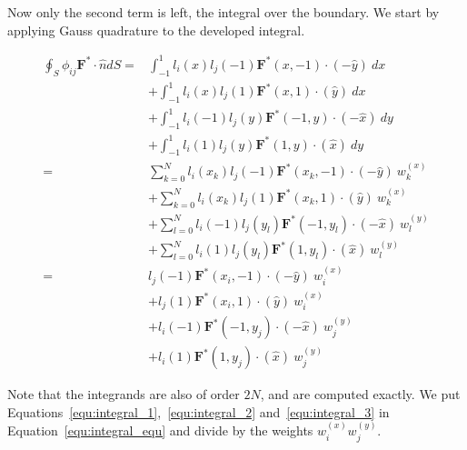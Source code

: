 Now only the second term is left, the integral over the boundary. We start by applying Gauss
quadrature to the developed integral.

\begin{equation} \label{equ:integral_2}
    \begin{split}
        \oint_{S} \phi_{i j}\mathbf{F}^* \cdot \widehat{n}dS = & 
        \int_{-1}^{1}l_i(x) l_j(-1)\mathbf{F}^*(x, -1) \cdot (-\widehat{y}) \: dx \\
        & + \int_{-1}^{1}l_i(x) l_j(1)\mathbf{F}^*(x, 1) \cdot (\widehat{y}) \: dx \\
        & + \int_{-1}^{1}l_i(-1) l_j(y)\mathbf{F}^*(-1, y) \cdot (-\widehat{x}) \: dy \\
        & + \int_{-1}^{1}l_i(1) l_j(y)\mathbf{F}^*(1, y) \cdot (\widehat{x}) \: dy \\
        = & \sum_{k = 0}^{N}l_i(x_k)l_j(-1)\mathbf{F}^*(x_k, -1)\cdot (-\widehat{y}) \: w_k^{(x)} \\
        & + \sum_{k = 0}^{N}l_i(x_k)l_j(1)\mathbf{F}^*(x_k, 1)\cdot (\widehat{y}) \: w_k^{(x)} \\
        & + \sum_{l = 0}^{N}l_i(-1)l_j(y_l)\mathbf{F}^*(-1, y_l)\cdot (-\widehat{x}) \: w_l^{(y)} \\
        & + \sum_{l = 0}^{N}l_i(1)l_j(y_l)\mathbf{F}^*(1, y_l)\cdot (\widehat{x}) \: w_l^{(y)} \\
        = & l_j(-1)\mathbf{F}^*(x_i, -1)\cdot (-\widehat{y}) \: w_i^{(x)} \\
        & + l_j(1)\mathbf{F}^*(x_i, 1)\cdot (\widehat{y}) \: w_i^{(x)} \\
        & + l_i(-1)\mathbf{F}^*(-1, y_j)\cdot (-\widehat{x}) \: w_j^{(y)} \\
        & + l_i(1)\mathbf{F}^*(1, y_j)\cdot (\widehat{x}) \: w_j^{(y)}
    \end{split}
\end{equation}

Note that the integrands are also of order \(2 N\), and are computed exactly. We put
Equations~\ref{equ:integral_1},~\ref{equ:integral_2} and~\ref{equ:integral_3} in
Equation~\ref{equ:integral_equ} and divide by the weights \(w_i^{ \left( x \right) } w_j^{ \left( y
\right) }\).

